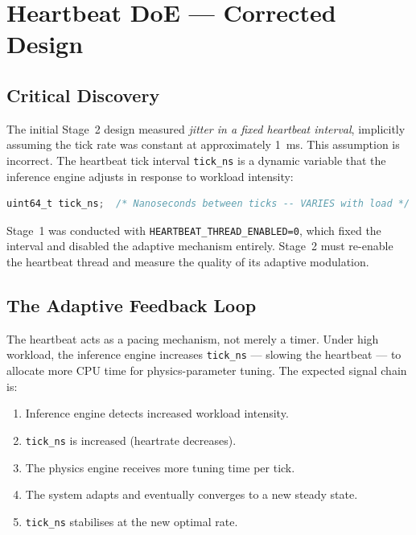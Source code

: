 
\section{Heartbeat DoE — Corrected Design}
\label{sec:heartbeat-doe-corrected-design}

\subsection{Critical Discovery}

The initial Stage~2 design measured \emph{jitter in a fixed heartbeat
interval}, implicitly assuming the tick rate was constant at approximately
1~ms. This assumption is incorrect. The heartbeat tick interval
\texttt{tick\_ns} is a dynamic variable that the inference engine adjusts in
response to workload intensity:

\begin{lstlisting}[language=C]
uint64_t tick_ns;  /* Nanoseconds between ticks -- VARIES with load */
\end{lstlisting}

Stage~1 was conducted with \texttt{HEARTBEAT\_THREAD\_ENABLED=0}, which fixed
the interval and disabled the adaptive mechanism entirely. Stage~2 must
re-enable the heartbeat thread and measure the quality of its adaptive
modulation.

\subsection{The Adaptive Feedback Loop}

The heartbeat acts as a pacing mechanism, not merely a timer. Under high
workload, the inference engine increases \texttt{tick\_ns} — slowing the
heartbeat — to allocate more CPU time for physics-parameter tuning. The
expected signal chain is:

\begin{enumerate}
  \item Inference engine detects increased workload intensity.
  \item \texttt{tick\_ns} is increased (heartrate decreases).
  \item The physics engine receives more tuning time per tick.
  \item The system adapts and eventually converges to a new steady state.
  \item \texttt{tick\_ns} stabilises at the new optimal rate.
\end{enumerate}


